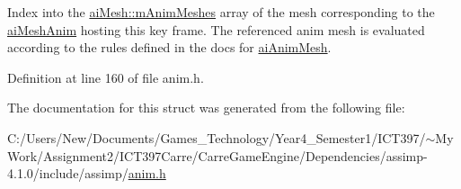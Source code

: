 Index into the \hyperlink{structai_mesh_5078f7db7e99ed05db89dfa412f0e990}{aiMesh::mAnimMeshes} array of the mesh corresponding to the \hyperlink{structai_mesh_anim}{aiMeshAnim} hosting this key frame. The referenced anim mesh is evaluated according to the rules defined in the docs for \hyperlink{structai_anim_mesh}{aiAnimMesh}. 

Definition at line 160 of file anim.h.

The documentation for this struct was generated from the following file:\begin{CompactItemize}
\item 
C:/Users/New/Documents/Games\_\-Technology/Year4\_\-Semester1/ICT397/$\sim$My Work/Assignment2/ICT397Carre/CarreGameEngine/Dependencies/assimp-4.1.0/include/assimp/\hyperlink{anim_8h}{anim.h}\end{CompactItemize}
